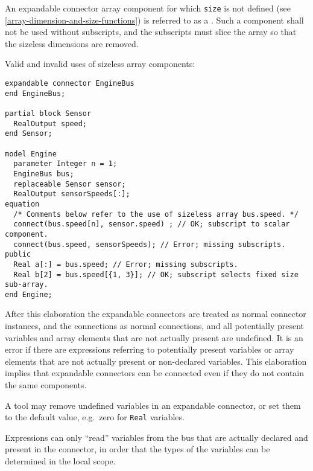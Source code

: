 An expandable connector array component for which \lstinline!size! is not defined (see \cref{array-dimension-and-size-functions}) is referred to as a .
Such a component shall not be used without subscripts, and the subscripts must slice the array so that the sizeless dimensions are removed.

\begin{example}
Valid and invalid uses of sizeless array components:
\begin{lstlisting}[language=modelica]
expandable connector EngineBus
end EngineBus;

partial block Sensor
  RealOutput speed;
end Sensor;

model Engine
  parameter Integer n = 1;
  EngineBus bus;
  replaceable Sensor sensor;
  RealOutput sensorSpeeds[:];
equation
  /* Comments below refer to the use of sizeless array bus.speed. */
  connect(bus.speed[n], sensor.speed) ; // OK; subscript to scalar component.
  connect(bus.speed, sensorSpeeds); // Error; missing subscripts.
public
  Real a[:] = bus.speed; // Error; missing subscripts.
  Real b[2] = bus.speed[{1, 3}]; // OK; subscript selects fixed size sub-array.
end Engine;
\end{lstlisting}
\end{example}

After this elaboration the expandable connectors are treated as normal connector instances, and the connections as normal connections, and all potentially present variables and array elements that are not actually present are undefined.
It is an error if there are expressions referring to potentially present variables or array elements that are not actually present or non-declared variables.
This elaboration implies that expandable connectors can be connected even if they do not contain the same components.

\begin{nonnormative}
A tool may remove undefined variables in an expandable connector, or set them to the default value, e.g.\ zero for \lstinline!Real! variables.
\end{nonnormative}

\begin{nonnormative}
Expressions can only ``read'' variables from the bus that are actually declared and present in the connector, in order that the types of the variables can be determined in the local scope.
\end{nonnormative}

